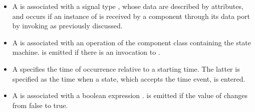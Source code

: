 \begin{itemize}[\footnotesize]
	\itemsep0em
	\item A  is associated with a signal type , whose data are described by attributes, and occurs if an instance of  is received by a component through its data port by invoking  as previously discussed. 
	
	\item A  is associated with an operation  of the component class containing the state machine. 
	 is emitted if there is an invocation to .
	
	\item A  specifies the time of occurrence  relative to a starting time. 
	The latter is specified as the time when a state, which accepts the time event, is entered.
	
	\item A  is associated with a boolean expression . 
	 is emitted if the value of  changes from false to true.
\end{itemize}

